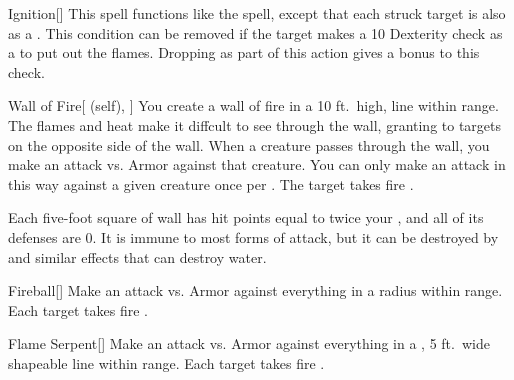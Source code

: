 \lowercase{\hypertarget{spell:Ignition}{}}\label{spell:Ignition}
\begin{apability}[\nth{2}]{\hypertarget{spell:Ignition}{Ignition}}[]
This spell functions like the  spell, except that each struck target is also  as a .
This condition can be removed if the target makes a  10 Dexterity check as a  to put out the flames.
Dropping  as part of this action gives a  bonus to this check.
\end{apability}
\vspace{0.25em}



\lowercase{\hypertarget{spell:Wall of Fire}{}}\label{spell:Wall of Fire}
\begin{attuneability}[\nth{2}]{\hypertarget{spell:Wall of Fire}{Wall of Fire}}[ (self), ]
You create a wall of fire in a 10 ft.\ high, \arealarge line within \rngmed range.
The flames and heat make it diffcult to see through the wall, granting  to targets on the opposite side of the wall.
When a creature passes through the wall, you make an attack vs. Armor against that creature.
You can only make an attack in this way against a given creature once per .
\hit The target takes fire .

Each five-foot square of wall has hit points equal to twice your , and all of its defenses are 0.
It is immune to most forms of attack, but it can be destroyed by  and similar effects that can destroy water.
\end{attuneability}
\vspace{0.25em}



\lowercase{\hypertarget{spell:Fireball}{}}\label{spell:Fireball}
\begin{apability}[\nth{3}]{\hypertarget{spell:Fireball}{Fireball}}[]
Make an attack vs. Armor against everything in a \areamed radius within \rnglong range.
\hit Each target takes fire .
\end{apability}
\vspace{0.25em}



\lowercase{\hypertarget{spell:Flame Serpent}{}}\label{spell:Flame Serpent}
\begin{apability}[\nth{3}]{\hypertarget{spell:Flame Serpent}{Flame Serpent}}[]
Make an attack vs. Armor against everything in a \arealarge, 5 ft.\ wide shapeable line within \rngmed range.
\hit Each target takes fire .
\end{apability}
\vspace{0.25em}



